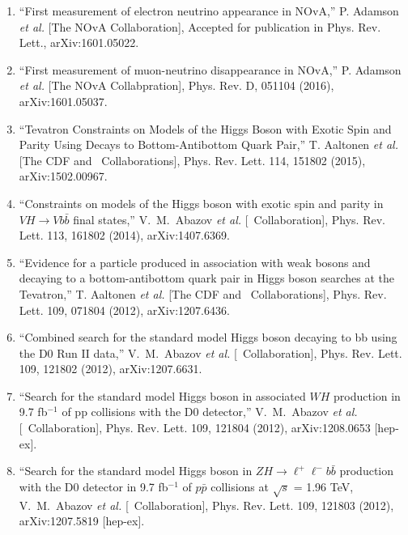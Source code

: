 \begin{enumerate}

\item ``First measurement of electron neutrino appearance in NOvA,''
P. Adamson {\it et al.} [The NOvA Collaboration],
Accepted for publication in Phys. Rev. Lett.,
arXiv:1601.05022.

\item ``First measurement of muon-neutrino disappearance in NOvA,''
P. Adamson {\it et al.} [The NOvA Collabpration],
Phys. Rev. D, 051104 (2016),
arXiv:1601.05037.

\item ``Tevatron Constraints 
on Models of the Higgs Boson with Exotic Spin and Parity Using Decays 
to Bottom-Antibottom Quark Pair,'' T. Aaltonen {\it et al.} 
[The CDF and \dzero\ Collaborations], 
Phys. Rev. Lett. 114, 151802 (2015),
arXiv:1502.00967.


\item ``Constraints on models of the Higgs boson with exotic spin and parity in $VH\to Vb\bar{b}$ final states,''
V.~M.~Abazov {\it et al.}  [\dzero\ Collaboration],
Phys. Rev. Lett. 113, 161802 (2014),
arXiv:1407.6369.

\item ``Evidence for a particle produced in association with weak bosons and decaying to a 
        bottom-antibottom quark pair in Higgs boson searches at the Tevatron,''
T. Aaltonen {\it et al.} [The CDF and \dzero\ Collaborations],
Phys. Rev. Lett. 109, 071804 (2012),
arXiv:1207.6436.

\item ``Combined search for the standard model Higgs boson decaying to bb using the D0 Run II data,''
V.~M.~Abazov {\it et al.}  [\dzero\ Collaboration],
Phys. Rev. Lett. 109, 121802 (2012),
arXiv:1207.6631.

\item ``Search for the standard model Higgs boson in associated $WH$ production in 9.7 fb$^{-1}$
          of pp collisions with the D0 detector,''
V.~M.~Abazov {\it et al.}  [\dzero\ Collaboration],
Phys. Rev. Lett. 109, 121804 (2012),
arXiv:1208.0653 [hep-ex].

\item ``Search for the standard model Higgs boson in $ZH\to\ell^+\ell^- b{\bar b}$ production with the D0
          detector in 9.7 fb$^{-1}$ of $p{\bar p}$ collisions at $\sqrt{s}$ = 1.96 TeV,
V.~M.~Abazov {\it et al.}  [\dzero\ Collaboration],
Phys. Rev. Lett. 109, 121803 (2012),
arXiv:1207.5819 [hep-ex].


\end{enumerate}
